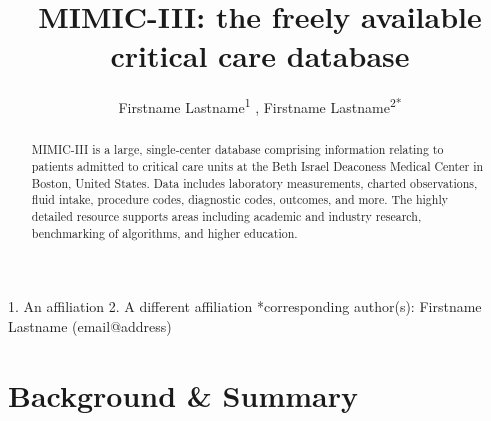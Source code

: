 \documentclass[english]{article}
\begin{document}
\title{MIMIC-III: the freely available critical care database}

\author{
Firstname Lastname\textsuperscript{1}
, Firstname Lastname\textsuperscript{2{*}}
}

\maketitle
\thispagestyle{fancy}

1. An affiliation 2. A different affiliation {*}corresponding author(s):
Firstname Lastname (email@address)

\begin{abstract} %
MIMIC-III is a large, single-center database comprising information relating to patients admitted to critical care units at the Beth Israel Deaconess Medical Center in Boston, United States. Data includes laboratory measurements, charted observations, fluid intake, procedure codes, diagnostic codes, outcomes, and more. The highly detailed resource supports areas including academic and industry research, benchmarking of algorithms, and higher education.
\end{abstract}

\section*{Background \& Summary} %

\end{document}
